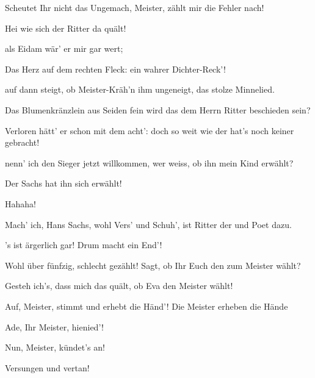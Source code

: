 \begin{drama}
\Beckmesserspeaks
Scheutet Ihr nicht das Ungemach,
Meister, zählt mir die Fehler nach!


Hei wie sich der Ritter da quält!

\Pognerspeaks
als Eidam wär' er mir gar wert;

\Sachsspeaks
Das Herz auf dem rechten Fleck:
ein wahrer Dichter-Reck'!

\Waltherspeaks
auf dann steigt,
ob Meister-Kräh'n ihm ungeneigt,
das stolze Minnelied.


Das Blumenkränzlein aus Seiden fein
wird das dem Herrn Ritter beschieden sein?

\Beckmesserspeaks
Verloren hätt' er schon mit dem acht':
doch so weit wie der hat's noch keiner gebracht!

\Pognerspeaks
nenn' ich den Sieger jetzt willkommen,
wer weiss, ob ihn mein Kind erwählt?


Der Sachs hat ihn sich erwählt!


Hahaha!

\Sachsspeaks
Mach' ich, Hans Sachs, wohl Vers' und Schuh',
ist Ritter der und Poet dazu.


's ist ärgerlich gar!
Drum macht ein End'!

\Beckmesserspeaks
Wohl über fünfzig, schlecht gezählt!
Sagt, ob Ihr Euch den zum Meister wählt?

\Pognerspeaks
Gesteh ich's, dass mich das quält,
ob Eva den Meister wählt!


Auf, Meister, stimmt
und erhebt die Händ'!
Die Meister erheben die Hände

\Waltherspeaks
Ade, Ihr Meister, hienied'!

\Beckmesserspeaks
Nun, Meister, kündet's an!


Versungen und vertan!

\end{drama}
